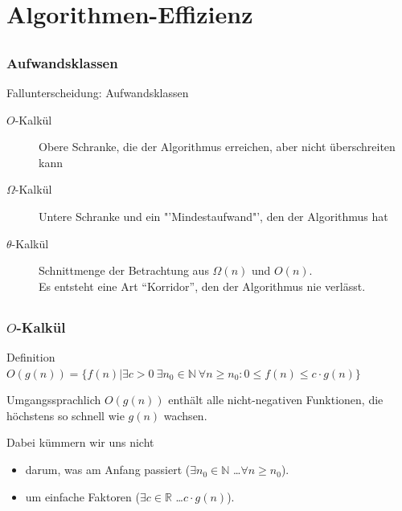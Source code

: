 
\section[Effizienz]{Algorithmen-Effizienz}
\subsection*{}
\begin{frame}
			\frametitle{Aufwandsklassen}
			\begin{block}{Fallunterscheidung: Aufwandsklassen}
                \begin{description}
                    \item[$O$-Kalkül] Obere Schranke, die der Algorithmus erreichen, aber nicht überschreiten kann
                    \item[$\Omega$-Kalkül] Untere Schranke und ein "'Mindestaufwand"', den der Algorithmus hat
					\item[$\theta$-Kalkül] Schnittmenge der Betrachtung aus $\Omega(n)$ und
					$O(n)$.\\ Es entsteht eine Art "`Korridor"', den der Algorithmus nie
					verlässt.
                \end{description}
			\end{block}
\end{frame}

\subsection*{}
\begin{frame}
  \frametitle{$O$-Kalkül}
    \begin{block}{Definition}
          $O(g(n))=\{f(n)| \exists c > 0 \ \exists n_{0} \in \mathbb{N}\ \forall n \ge n_{0}: 0 \le f(n) \le c\cdot g(n)\}$
    \end{block}

    \begin{block}{Umgangssprachlich}
        $O(g(n))$ enthält alle nicht-negativen Funktionen, die höchstens so schnell wie $g(n)$ wachsen.

        Dabei kümmern wir uns nicht

  \begin{itemize}
    \item darum, was am Anfang passiert ($\exists n_0\in\mathbb{N}$ \ldots $\forall n\ge n_0$).
    \item um einfache Faktoren ($\exists c\in\mathbb{R}$ \ldots $c\cdot g(n)$).
  \end{itemize}
  \end{block}
\end{frame}

